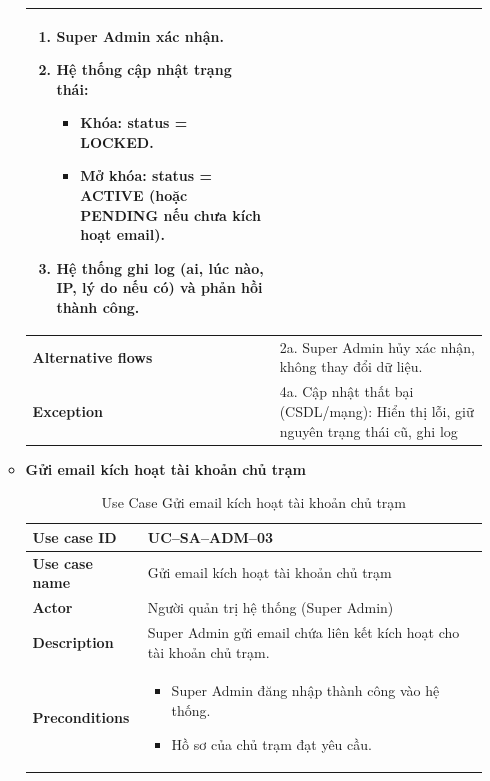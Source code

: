 \begin{enumerate}[label=\textbf{\alph*)}]
\begin{itemize}
\begin{center}
\begin{longtable}{|m{}|m{}|}
\begin{enumerate}[label=\arabic*.]
            \item Super Admin xác nhận.
            \item Hệ thống cập nhật trạng thái:
              \begin{itemize}
                \item Khóa: status = LOCKED.
                \item Mở khóa: status = ACTIVE (hoặc PENDING nếu chưa kích hoạt email).
              \end{itemize}
            \item Hệ thống ghi log (ai, lúc nào, IP, lý do nếu có) và phản hồi thành công.

          \end{enumerate}\\
          \hline
          \textbf{Alternative flows} &
          2a. Super Admin hủy xác nhận, không thay đổi dữ liệu.\\
          \hline
          \textbf{Exception} &
          4a. Cập nhật thất bại (CSDL/mạng): Hiển thị lỗi, giữ nguyên trạng thái cũ, ghi log\\
          \hline
          \end{longtable}
      \end{center}
    \item \textbf{Gửi email kích hoạt tài khoản chủ trạm}
      \begin{center}
        \renewcommand{\arraystretch}{1.5}
        \begin{longtable}{|m{}|m{}|}
          \caption{Use Case Gửi email kích hoạt tài khoản chủ trạm}
          \label{tab:uc_sa_adm_03} \\
          \hline
          \textbf{Use case ID} & UC--SA--ADM--03 \\
          \hline
          \textbf{Use case name} & Gửi email kích hoạt tài khoản chủ trạm \\
          \hline
          \textbf{Actor} & Người quản trị hệ thống (Super Admin) \\
          \hline
          \textbf{Description} & Super Admin gửi email chứa liên kết kích hoạt cho tài khoản chủ trạm. \\
          \hline
          \textbf{Preconditions} &
          \begin{itemize}
            \item Super Admin đăng nhập thành công vào hệ thống.
            \item Hồ sơ của chủ trạm đạt yêu cầu.

\end{itemize}
\end{longtable}
\end{center}
\end{itemize}
\end{enumerate}
